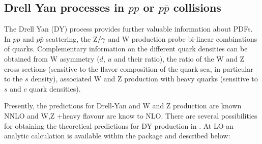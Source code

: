 \subsection{Drell Yan processes  in $pp$ or $p\bar p$ collisions}
\label{dysection}

The Drell Yan (DY) process
provides further valuable information about PDFs.
In $pp$ and $p\bar p$ scattering, the Z$/\gamma\*$ and W production 
probe bi-linear combinations of quarks. 
Complementary information on the different quark densities
can be obtained from W asymmetry ($d$, $u$ and their ratio),
the ratio of the W and Z cross sections (sensitive to the flavor 
composition of the quark sea, in particular to the $s$ density), 
associated W and Z production with
heavy quarks (sensitive to $s$ and $c$ quark densities).
%

Presently, the predictions for Drell-Yan and W and Z production are known 
NNLO and W,Z +heavy flavour are know to NLO. There are several possibilities 
for obtaining the theoretical
predictions for DY production in \fitter. 
At LO an analytic calculation is available within the package and described
below: 

